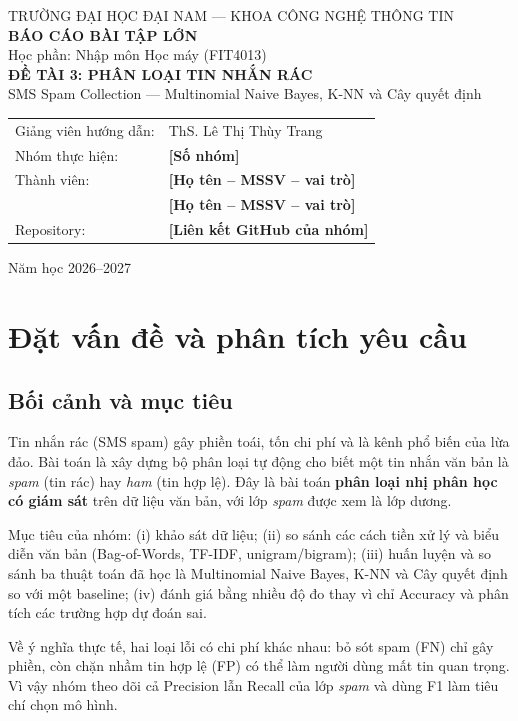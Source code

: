 \documentclass[12pt,a4paper]{article}
\newcommand{\spam}{\textit{spam}}
\newcommand{\ham}{\textit{ham}}
\begin{document}
\begin{titlepage}
\centering
{\large TRƯỜNG ĐẠI HỌC ĐẠI NAM --- KHOA CÔNG NGHỆ THÔNG TIN}\\[1.2cm]
{\Large \textbf{BÁO CÁO BÀI TẬP LỚN}}\\[0.3cm]
{\large Học phần: Nhập môn Học máy (FIT4013)}\\[1.8cm]
{\LARGE \textbf{ĐỀ TÀI 3: PHÂN LOẠI TIN NHẮN RÁC}}\\[0.4cm]
{\large SMS Spam Collection --- Multinomial Naive Bayes, K-NN và Cây quyết định}\\[2cm]
\begin{tabular}{ll}
Giảng viên hướng dẫn: & ThS. Lê Thị Thùy Trang\\
Nhóm thực hiện: & \textbf{[Số nhóm]}\\
Thành viên: & \textbf{[Họ tên -- MSSV -- vai trò]}\\
 & \textbf{[Họ tên -- MSSV -- vai trò]}\\
Repository: & \textbf{[Liên kết GitHub của nhóm]}\\
\end{tabular}
\vfill
{\large Năm học 2026--2027}
\end{titlepage}

\tableofcontents
\newpage

\section{Đặt vấn đề và phân tích yêu cầu}
\subsection{Bối cảnh và mục tiêu}
Tin nhắn rác (SMS spam) gây phiền toái, tốn chi phí và là kênh phổ biến của lừa đảo. Bài toán là xây dựng bộ phân loại tự động cho biết một tin nhắn văn bản là \spam{} (tin rác) hay \ham{} (tin hợp lệ). Đây là bài toán \textbf{phân loại nhị phân học có giám sát} trên dữ liệu văn bản, với lớp \spam{} được xem là lớp dương.

Mục tiêu của nhóm: (i) khảo sát dữ liệu; (ii) so sánh các cách tiền xử lý và biểu diễn văn bản (Bag-of-Words, TF-IDF, unigram/bigram); (iii) huấn luyện và so sánh ba thuật toán đã học là Multinomial Naive Bayes, K-NN và Cây quyết định so với một baseline; (iv) đánh giá bằng nhiều độ đo thay vì chỉ Accuracy và phân tích các trường hợp dự đoán sai.

Về ý nghĩa thực tế, hai loại lỗi có chi phí khác nhau: bỏ sót spam (FN) chỉ gây phiền, còn chặn nhầm tin hợp lệ (FP) có thể làm người dùng mất tin quan trọng. Vì vậy nhóm theo dõi cả Precision lẫn Recall của lớp \spam{} và dùng F1 làm tiêu chí chọn mô hình.
\end{document}
